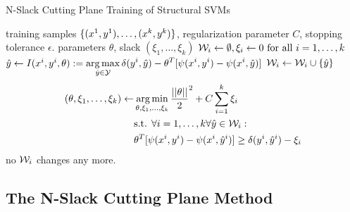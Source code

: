 \begin{algorithm*}[t]
    \caption{N-Slack Cutting Plane Training of Structural SVMs \label{alg_n_slack}}
    \begin{doublespacing}
    \begin{algorithmic}[1]
        \Require training samples $\{ (x^{1}, y^{1}), \dots, (x^{k}, y^{k})\}$, regularization parameter $C$, stopping tolerance $\epsilon$.
        \Ensure parameters $\theta$, slack $(\xi_1, \dotsc, \xi_k)$
        \State $\mathcal{W}_i \leftarrow \emptyset, \xi_i \leftarrow 0 \text{ for all } i=1,\dots,k$
        \Repeat
                \State
                $\hat{y} \leftarrow I(x^{i}, y^{i}, \theta) := \displaystyle \operatorname*{arg\,max}_{\hat{y}\in\mathcal{Y}} \delta(y^{i}, \hat{y}) - \theta^T [\psi(x^{i}, y^{i}) - \psi(x^{i}, \hat{y})] $
                    \State $\mathcal{W}_i \leftarrow \mathcal{W}_i \cup \{ \hat{y}\} $
                    \State
                    \vspace{-15mm}
                    \begin{align*}
                    (\theta, \xi_1, \dots, \xi_k) \leftarrow \displaystyle &\operatorname*{arg\,min}_{\theta, \xi_1, \dots, \xi_k} \frac{||\theta||}{2}^2 + C \sum_{i=1}^k\xi_i\\
                    &\text{s.t. }\forall i=1,\dots,k \forall \hat{y} \in \mathcal{W}_i:\\
                    &\theta^T [\psi(x^{i}, y^{i}) - \psi(x^{i}, \hat{y}^{i})] \geq \delta(y^{i}, \hat{y}^{i}) - \xi_i
                    \end{align*}
                \EndIf
            \EndFor
            \vspace{-10mm}
            \Until no $\mathcal{W}_i$ changes any more.
        \end{algorithmic}
    \end{doublespacing}
    \end{algorithm*}

\subsection{The N-Slack Cutting Plane Method}

